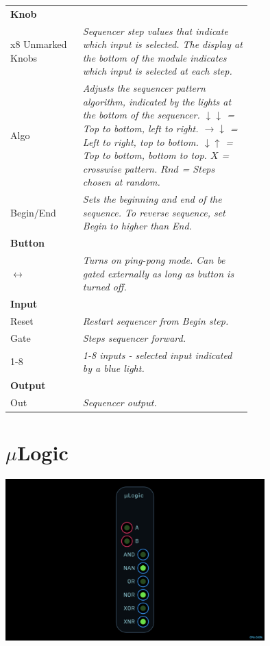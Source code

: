 \documentclass[11pt]{book}
\begin{document}
\begin{table}[ht]
\small
\sffamily
\renewcommand\arraystretch{1.5}
\centering
\begin{tabular}{l*{1}{>{\raggedright\arraybackslash}p{0.7\linewidth}}}

\toprule
\textbf{Knob} \\
x8 Unmarked Knobs & \textit{Sequencer step values that indicate which input is selected. The display at the bottom of the module indicates which input is selected at each step.} \\
Algo & \textit{Adjusts the sequencer pattern algorithm, indicated by the lights at the bottom of the sequencer. $\downarrow \downarrow$ = Top to bottom, left to right. $\rightarrow \downarrow$ = Left to right, top to bottom. $\downarrow \uparrow$ = Top to bottom, bottom to top. $X$ = crosswise pattern. $Rnd$ = Steps chosen at random.} \\
Begin/End & \textit{Sets the beginning and end of the sequence. To reverse sequence, set Begin to higher than End.} \\

\midrule
\textbf{Button} \\
$\leftrightarrow$ & \textit{Turns on ping-pong mode. Can be gated externally as long as button is turned off.} \\

\midrule
\textbf{Input} \\
Reset & \textit{Restart sequencer from Begin step.} \\
Gate & \textit{Steps sequencer forward.} \\
1-8 & \textit{1-8 inputs - selected input indicated by a blue light.} \\

\midrule
\textbf{Output} \\
Out & \textit{Sequencer output.} \\

\bottomrule
\end{tabular}
\end{table}

\pagebreak


\section{$\mu$Logic}

\begin{center}
\includegraphics[width=0.75\textwidth]{ulogic.png}
\end{center}
\end{document}
